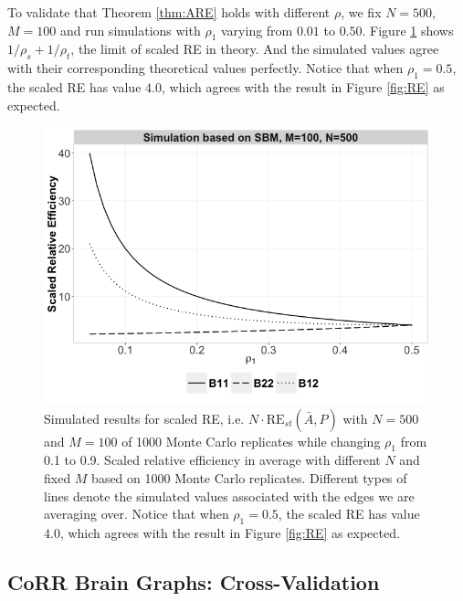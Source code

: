 \documentclass[a4paper]{article}
\begin{document}
To validate that Theorem \ref{thm:ARE} holds with different $\rho$, we fix $N=500$, $M=100$ and run simulations with $\rho_1$ varying from $0.01$ to $0.50$. Figure \ref{fig:RErho} shows $1/\rho_s + 1/\rho_t$, the limit of scaled RE in theory. And the simulated values agree with their corresponding theoretical values perfectly. Notice that when $\rho_1 = 0.5$, the scaled RE has value $4.0$, which agrees with the result in Figure \ref{fig:RE} as expected.

\begin{figure}[!htb]
\centering
\includegraphics[width=1\textwidth]{Rho.png}
\caption{Simulated results for scaled RE, i.e. $N \cdot \mathrm{RE}_{st}(\bar{A}, \hat{P})$ with $N = 500$ and $M = 100$ of 1000 Monte Carlo replicates while changing $\rho_1$ from 0.1 to 0.9. Scaled relative efficiency in average with different $N$ and fixed $M$ based on 1000 Monte Carlo replicates. Different types of lines denote the simulated values associated with the edges we are averaging over. Notice that when $\rho_1 = 0.5$, the scaled RE has value $4.0$, which agrees with the result in Figure \ref{fig:RE} as expected.}
\label{fig:RErho}
\end{figure}

\subsection{CoRR Brain Graphs: Cross-Validation}
\end{document}

